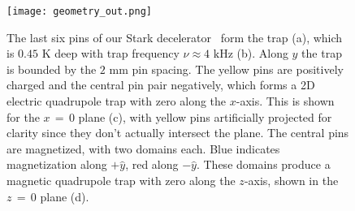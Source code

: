 \documentclass[%
 reprint,
 amsmath,amssymb,
 aps,
prl,
]{revtex4-1}
\begin{document}
\begin{figure}[tb]
\texttt{[image: geometry\_out.png]}%
\caption{
The last six pins of our Stark decelerator~\cite{Sawyer2008} form the trap (a), which is $0.45\text{ K}$ deep with trap frequency $\nu\approx4\text{ kHz}$ (b). 
Along $y$ the trap is bounded by the $2\text{ mm}$ pin spacing. 
The yellow pins are positively charged and the central pin pair negatively, which forms a 2D electric quadrupole trap with zero along the $x$-axis. 
This is shown for the $x\,{=}\,0$ plane (c), with yellow pins artificially projected for clarity since they don't actually intersect the plane. 
The central pins are magnetized, with two domains each. 
Blue indicates magnetization along $+\hat{y}$, red along $-\hat{y}$. 
These domains produce a magnetic quadrupole trap with zero along the $z$-axis, shown in the $z\,{=}\,0$ plane (d). 
\label{fig:CAD}}
\end{figure}


\end{document}
